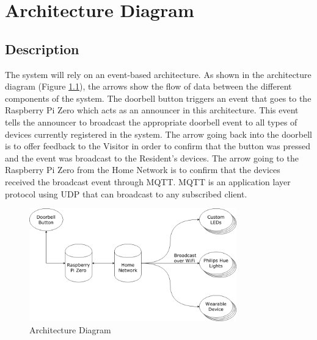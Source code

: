 \chapter{Architecture Diagram}

\section{Description}
The system will rely on an event-based architecture. As shown in the architecture diagram (Figure \ref{fig:architecture}), the arrows show the flow of data between the different components of the system. The doorbell button triggers an event that goes to the Raspberry Pi Zero which acts as an announcer in this architecture. This event tells the announcer to broadcast the appropriate doorbell event to all types of devices currently registered in the system. The arrow going back into the doorbell is to offer feedback to the Visitor in order to confirm that the button was pressed and the event was broadcast to the Resident's devices. The arrow going to the Raspberry Pi Zero from the Home Network is to confirm that the devices received the broadcast event through MQTT. MQTT is an application layer protocol using UDP that can broadcast to any subscribed client.

\begin{figure}[h]
  \includegraphics[width=0.8\textwidth]{Architecture-new.png}
  \centering
  \caption{Architecture Diagram}
  \label{fig:architecture}
\end{figure}
